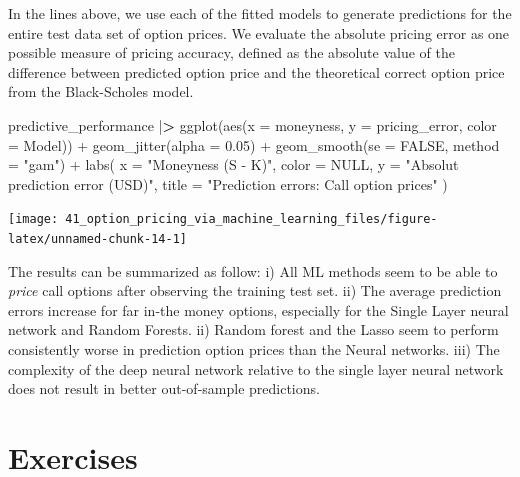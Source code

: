 \documentclass[
]{book}
\newenvironment{Shaded}{\begin{snugshade}}{\end{snugshade}}
\newcommand{\AttributeTok}[1]{\textcolor[rgb]{0.61,0.61,0.61}{#1}}
\newcommand{\ConstantTok}[1]{\textcolor[rgb]{0,0,0}{#1}}
\newcommand{\ErrorTok}[1]{\textcolor[rgb]{0.14,0.14,0.14}{\textbf{#1}}}
\newcommand{\FloatTok}[1]{\textcolor[rgb]{0.06,0.06,0.06}{#1}}
\newcommand{\FunctionTok}[1]{\textcolor[rgb]{0,0,0}{#1}}
\newcommand{\NormalTok}[1]{#1}
\newcommand{\SpecialCharTok}[1]{\textcolor[rgb]{0,0,0}{#1}}
\newcommand{\StringTok}[1]{\textcolor[rgb]{0.5,0.5,0.5}{#1}}
\begin{document}
In the lines above, we use each of the fitted models to generate predictions for the entire test data set of option prices. We evaluate the absolute pricing error as one possible measure of pricing accuracy, defined as the absolute value of the difference between predicted option price and the theoretical correct option price from the Black-Scholes model.

\begin{Shaded}
\begin{Highlighting}[]
\NormalTok{predictive\_performance }\SpecialCharTok{|}\ErrorTok{\textgreater{}}
  \FunctionTok{ggplot}\NormalTok{(}\FunctionTok{aes}\NormalTok{(}\AttributeTok{x =}\NormalTok{ moneyness, }\AttributeTok{y =}\NormalTok{ pricing\_error, }\AttributeTok{color =}\NormalTok{ Model)) }\SpecialCharTok{+}
  \FunctionTok{geom\_jitter}\NormalTok{(}\AttributeTok{alpha =} \FloatTok{0.05}\NormalTok{) }\SpecialCharTok{+}
  \FunctionTok{geom\_smooth}\NormalTok{(}\AttributeTok{se =} \ConstantTok{FALSE}\NormalTok{, }\AttributeTok{method =} \StringTok{"gam"}\NormalTok{) }\SpecialCharTok{+}
  \FunctionTok{labs}\NormalTok{(}
    \AttributeTok{x =} \StringTok{"Moneyness (S {-} K)"}\NormalTok{, }\AttributeTok{color =} \ConstantTok{NULL}\NormalTok{,}
    \AttributeTok{y =} \StringTok{"Absolut prediction error (USD)"}\NormalTok{,}
    \AttributeTok{title =} \StringTok{"Prediction errors: Call option prices"}
\NormalTok{  )}
\end{Highlighting}
\end{Shaded}

\begin{center}\texttt{[image: 41\_option\_pricing\_via\_machine\_learning\_files/figure-latex/unnamed-chunk-14-1]} \end{center}

The results can be summarized as follow: i) All ML methods seem to be able to \emph{price} call options after observing the training test set. ii) The average prediction errors increase for far in-the money options, especially for the Single Layer neural network and Random Forests. ii) Random forest and the Lasso seem to perform consistently worse in prediction option prices than the Neural networks. iii) The complexity of the deep neural network relative to the single layer neural network does not result in better out-of-sample predictions.

\hypertarget{exercises-9}{%
\section{Exercises}\label{exercises-9}}
\end{document}
